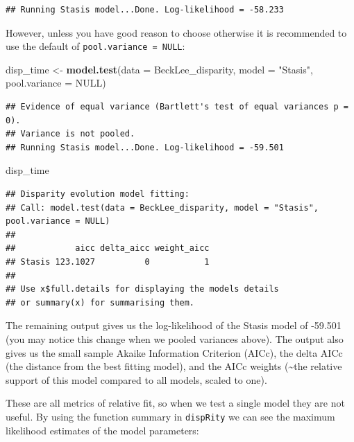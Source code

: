 \documentclass[]{book}
\newenvironment{Shaded}{\begin{snugshade}}{\end{snugshade}}
\newcommand{\KeywordTok}[1]{\textcolor[rgb]{0.13,0.29,0.53}{\textbf{#1}}}
\newcommand{\DataTypeTok}[1]{\textcolor[rgb]{0.13,0.29,0.53}{#1}}
\newcommand{\StringTok}[1]{\textcolor[rgb]{0.31,0.60,0.02}{#1}}
\newcommand{\OtherTok}[1]{\textcolor[rgb]{0.56,0.35,0.01}{#1}}
\newcommand{\NormalTok}[1]{#1}
\theoremstyle{definition}
\theoremstyle{definition}
\theoremstyle{definition}
\theoremstyle{remark}
\begin{document}
\begin{verbatim}
## Running Stasis model...Done. Log-likelihood = -58.233
\end{verbatim}

However, unless you have good reason to choose otherwise it is
recommended to use the default of \texttt{pool.variance\ =\ NULL}:

\begin{Shaded}
\begin{Highlighting}[]
\NormalTok{disp_time <-}\StringTok{ }\KeywordTok{model.test}\NormalTok{(}\DataTypeTok{data =}\NormalTok{ BeckLee_disparity, }\DataTypeTok{model =} \StringTok{"Stasis"}\NormalTok{, }\DataTypeTok{pool.variance =} \OtherTok{NULL}\NormalTok{)}
\end{Highlighting}
\end{Shaded}

\begin{verbatim}
## Evidence of equal variance (Bartlett's test of equal variances p = 0).
## Variance is not pooled.
## Running Stasis model...Done. Log-likelihood = -59.501
\end{verbatim}

\begin{Shaded}
\begin{Highlighting}[]
\NormalTok{disp_time}
\end{Highlighting}
\end{Shaded}

\begin{verbatim}
## Disparity evolution model fitting:
## Call: model.test(data = BeckLee_disparity, model = "Stasis", pool.variance = NULL) 
## 
##            aicc delta_aicc weight_aicc
## Stasis 123.1027          0           1
## 
## Use x$full.details for displaying the models details
## or summary(x) for summarising them.
\end{verbatim}

The remaining output gives us the log-likelihood of the Stasis model of
-59.501 (you may notice this change when we pooled variances above). The
output also gives us the small sample Akaike Information Criterion
(AICc), the delta AICc (the distance from the best fitting model), and
the AICc weights (\textasciitilde{}the relative support of this model
compared to all models, scaled to one).

These are all metrics of relative fit, so when we test a single model
they are not useful. By using the function summary in \texttt{dispRity}
we can see the maximum likelihood estimates of the model parameters:
\end{document}
